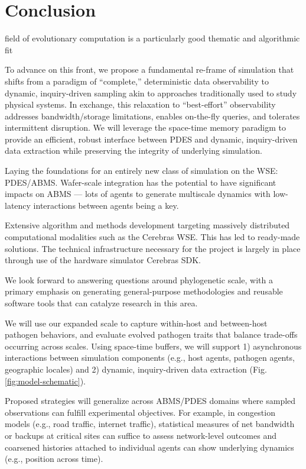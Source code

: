 \section{Conclusion} \label{sec:conclusion}

field of evolutionary computation is a particularly good thematic and algorithmic fit

To advance on this front, we propose a fundamental re-frame of simulation that shifts from a paradigm of ``complete,'' deterministic data observability to dynamic, inquiry-driven sampling akin to approaches traditionally used to study physical systems.
In exchange, this relaxation to ``best-effort'' observability addresses bandwidth/storage limitations, enables on-the-fly queries, and tolerates intermittent disruption.
We will leverage the space-time memory paradigm to provide an efficient, robust interface between PDES and dynamic, inquiry-driven data extraction while preserving the integrity of underlying simulation.

Laying the foundations for an entirely new class of simulation on the WSE: PDES/ABMS.
Wafer-scale integration has the potential to have significant impacts on ABMS --- lots of agents to generate multiscale dynamics with low-latency interactions between agents being a key.

Extensive algorithm and methods development targeting massively distributed computational modalities such as the Cerebras WSE.
This has led to ready-made solutions.
The technical infrastructure necessary for the project is largely in place through use of the hardware simulator Cerebras SDK.

We look forward to answering questions around phylogenetic scale, with a primary emphasis on generating general-purpose methodologies and reusable software tools that can catalyze research in this area.


We will use our expanded scale to capture within-host and between-host pathogen behaviors, and evaluate evolved pathogen traits that balance trade-offs occurring across scales.
Using space-time buffers, we will support 1) asynchronous interactions between simulation components (e.g., host agents, pathogen agents, geographic locales) and 2) dynamic, inquiry-driven data extraction (Fig. \ref{fig:model-schematic}).

Proposed strategies will generalize across ABMS/PDES domains where sampled observations can fulfill experimental objectives.
For example, in congestion models (e.g., road traffic, internet traffic), statistical measures of net bandwidth or backups at critical sites can suffice to assess network-level outcomes and coarsened histories attached to individual agents can show underlying dynamics (e.g., position across time).
%